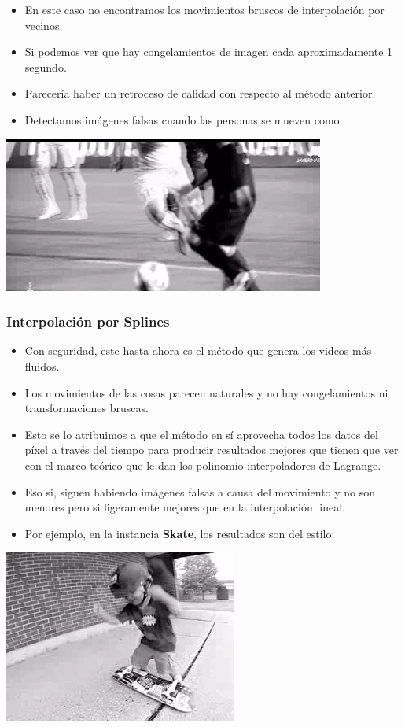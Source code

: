\begin{itemize}
\item En este caso no encontramos los movimientos bruscos de interpolación por vecinos.
\item Si podemos ver que hay congelamientos de imagen cada aproximadamente 1 segundo.
\item Parecería haber un retroceso de calidad con respecto al método anterior.
\item Detectamos imágenes falsas cuando las personas se mueven como:
\end{itemize}

\includegraphics[scale=1]{imagenes/art1.png}

\subsubsection{Interpolación por Splines}

\begin{itemize}
\item Con seguridad, este hasta ahora es el método que genera los videos más fluidos.
\item Los movimientos de las cosas parecen naturales y no hay congelamientos ni transformaciones bruscas.
\item Esto se lo atribuimos a que el método en sí aprovecha todos los datos del píxel a través del tiempo para producir resultados mejores que tienen que ver con el marco teórico que le dan los polinomio interpoladores de Lagrange.
\item Eso si, siguen habiendo imágenes falsas a causa del movimiento y no son menores pero si ligeramente mejores que en la interpolación lineal.
\item Por ejemplo, en la instancia \textbf{Skate}, los resultados son del estilo:
\end{itemize}

\includegraphics[scale=1]{imagenes/art2.png}

